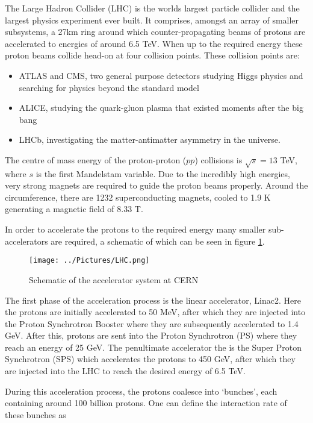 The Large Hadron Collider (LHC) is the worlds largest particle collider and the largest physics experiment ever built. 
It comprises, amongst an array of smaller subsystems, a 27km ring around which counter-propagating beams of protons are accelerated to energies of around 6.5 TeV. 
When up to the required energy these proton beams collide head-on at four collision points.
These collision points are:
\begin{itemize}
\item ATLAS and CMS, two general purpose detectors studying Higgs physics and searching for physics beyond the standard model
\item ALICE, studying the quark-gluon plasma that existed moments after the big bang
\item LHCb, investigating the matter-antimatter asymmetry in the universe.
\end{itemize}
The centre of mass energy of the proton-proton ($pp$) collisions is $\sqrt{s}=13$ TeV, where $s$ is the first Mandelstam variable.
Due to the incredibly high energies, very strong magnets are required to guide the proton beams properly.
Around the circumference, there are 1232 superconducting magnets, cooled to 1.9 K generating a magnetic field of 8.33 T.

In order to accelerate the protons to the required energy many smaller sub-accelerators are required, a schematic of which can be seen in figure \ref{fig:LHC}.

\begin{figure}[H] %
   \centering
   \texttt{[image: ../Pictures/LHC.png]} 
   \caption{Schematic of the accelerator system at CERN \cite{Mobs:2197559}}
   \label{fig:LHC}
\end{figure}

\noindent The first phase of the acceleration process is the linear accelerator, Linac2. 
Here the protons are initially accelerated to 50 MeV, after which they are injected into the Proton Synchrotron Booster where they are subsequently accelerated to 1.4 GeV.
After this, protons are sent into the Proton Synchrotron (PS) where they reach an energy of 25 GeV.
The penultimate accelerator the is the Super Proton Synchrotron (SPS) which accelerates the protons to 450 GeV, after which they are injected into the LHC to reach the desired energy of 6.5 TeV.

During this acceleration process, the protons coalesce into `bunches', each containing around 100 billion protons.
One can define the interaction rate of these bunches as

